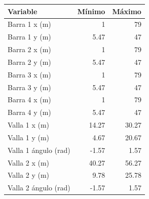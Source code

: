 \begin{tabular}{lrr}
\toprule
Variable & Mínimo & Máximo \\
\midrule
Barra 1 x (m) & 1 & 79 \\
Barra 1 y (m) & 5.47 & 47 \\
Barra 2 x (m) & 1 & 79 \\
Barra 2 y (m) & 5.47 & 47 \\
Barra 3 x (m) & 1 & 79 \\
Barra 3 y (m) & 5.47 & 47 \\
Barra 4 x (m) & 1 & 79 \\
Barra 4 y (m) & 5.47 & 47 \\
Valla 1 x (m) & 14.27 & 30.27 \\
Valla 1 y (m) & 4.67 & 20.67 \\
Valla 1 ángulo (rad) & -1.57 & 1.57 \\
Valla 2 x (m) & 40.27 & 56.27 \\
Valla 2 y (m) & 9.78 & 25.78 \\
Valla 2 ángulo (rad) & -1.57 & 1.57 \\
\bottomrule
\end{tabular}
